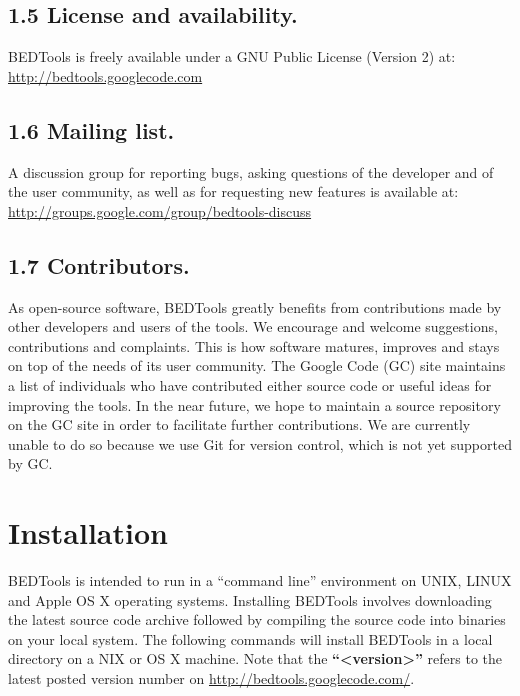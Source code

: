 \documentclass[letterpaper,10pt,english]{sphinxmanual}
\begin{document}
\subsection{1.5 License and availability.}
\label{content/overview:license-and-availability}
BEDTools is freely available under a GNU Public License (Version 2) at:
\href{http://bedtools.googlecode.com}{http://bedtools.googlecode.com}


\subsection{1.6 Mailing list.}
\label{content/overview:mailing-list}
A discussion group for reporting bugs, asking questions of the developer and of the user community, as
well as for requesting new features is available at:
\href{http://groups.google.com/group/bedtools-discuss}{http://groups.google.com/group/bedtools-discuss}


\subsection{1.7 Contributors.}
\label{content/overview:contributors}
As open-source software, BEDTools greatly benefits from contributions made by other developers and
users of the tools. We encourage and welcome suggestions, contributions and complaints. This is how
software matures, improves and stays on top of the needs of its user community. The Google Code
(GC) site maintains a list of individuals who have contributed either source code or useful ideas for
improving the tools. In the near future, we hope to maintain a source repository on the GC site in
order to facilitate further contributions. We are currently unable to do so because we use Git for
version control, which is not yet supported by GC.


\section{Installation}
\label{content/installation:installation}\label{content/installation::doc}
BEDTools is intended to run in a ``command line'' environment on UNIX, LINUX and Apple OS X
operating systems. Installing BEDTools involves downloading the latest source code archive followed by
compiling the source code into binaries on your local system. The following commands will install
BEDTools in a local directory on a NIX or OS X machine. Note that the \textbf{``\textless{}version\textgreater{}''} refers to the
latest posted version number on \href{http://bedtools.googlecode.com/}{http://bedtools.googlecode.com/}.
\end{document}
